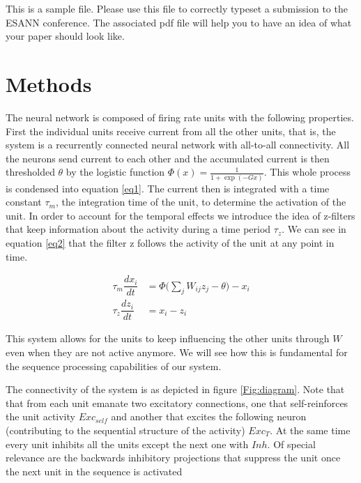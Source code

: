 \documentclass{esannV2}
\begin{document}
This is a sample file. Please use this file to correctly typeset a
submission to the ESANN conference. The associated pdf file will
help you to have an idea of what your paper should look like.

\section{Methods}
The neural network is composed of firing rate units with the following properties. First the individual units receive current from all the other units, that is, the system is a recurrently connected neural network with all-to-all connectivity. All the neurons send current to each other and the accumulated current is then  thresholded $\theta$ by the logistic function $\Phi(x) = \frac{1}{1 + \exp(-Gx)}$. This whole process is condensed into equation \ref{eq1}. The current then is integrated with a time constant $\tau_m$, the integration time of the unit, to determine the activation of the unit. In order to account for the temporal effects we introduce the idea of z-filters that keep information about the activity during a time period $\tau_z$. We can see in equation \ref{eq2} that the filter z follows the activity of the unit at any point in time.

\begin{align}
\tau_m \dfrac{dx_i}{dt} &= \Phi\Big(\sum_{j} W_{ij} z_j - \theta \Big) - x_i \label{eq1} \\ 
\tau_z \dfrac{dz_i}{dt} &= x_i - z_i \label{eq2}
\end{align}

This system allows for the units to keep influencing the other units through $W$ even when they are not active anymore. We will see how this is fundamental for the sequence processing capabilities of our system. 

The connectivity of the system is as depicted in figure \ref{Fig:diagram}. Note that that from each unit emanate two excitatory connections, one that self-reinforces the unit activity $Exc_{self}$ and another that excites the following neuron (contributing to the sequential structure of the activity) $Exc_T$. At the same time every unit inhibits all the units except the next one with $Inh$. Of special relevance are the backwards inhibitory projections that suppress the unit once the next unit in the sequence is activated 
\end{document}
